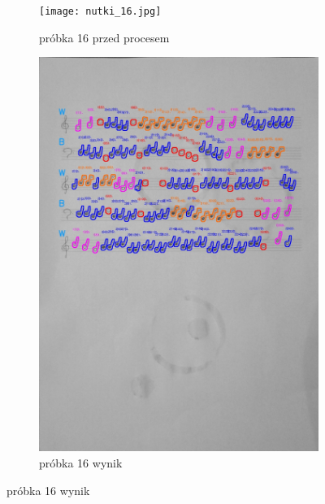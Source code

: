 \documentclass[11pt]{article}
\begin{document}
\begin{figure}[H]
    \centering
    \begin{subfigure}[b]{0.475\textwidth}
        \centering
        \graphicspath{ {Resources/} }
        \texttt{[image: nutki\_16.jpg]}
        \caption[]%
        {{\small próbka 16 przed procesem}}
        \label{fig:sub1}
    \end{subfigure}
    \hfill
    \begin{subfigure}[b]{0.475\textwidth}
        \centering
        \graphicspath{ {blobs/} }
        \includegraphics[width=\textwidth]{16_cnts.jpg}
        \caption[]%
        {{\small próbka 16 wynik}}
        \label{fig:sub2}
    \end{subfigure}
\end{figure}
\end{document}
